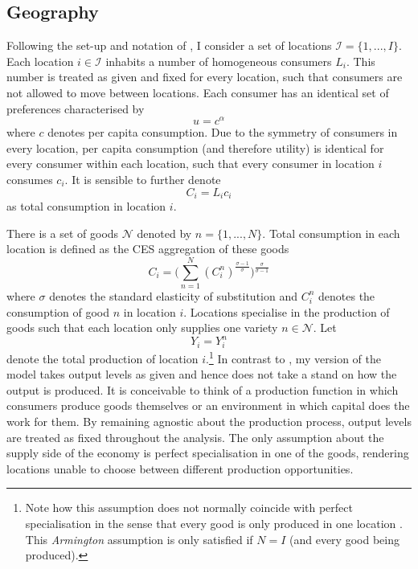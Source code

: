 \documentclass[11pt, oneside]{article}   	%
\begin{document}
\subsection{Geography}

Following the set-up and notation of \cite{fajgelbaum_optimal_2017}, I consider a set of locations $\mathcal{I} =\{ 1,...,I\}$. Each location $i \in \mathcal{I}$ inhabits a number of homogeneous consumers $L_{i}$. This number is treated as given and fixed for every location, such that consumers are not allowed to move between locations. Each consumer has an identical set of preferences characterised by
\begin{equation*}
  u = c^{\alpha}
\end{equation*}
where $c$ denotes per capita consumption. Due to the symmetry of consumers in every location, per capita consumption (and therefore utility) is identical for every consumer within each location, such that every consumer in location $i$ consumes $c_{i}$. It is sensible to further denote
\begin{equation*}
  C_{i} = L_{i}c_{i}
\end{equation*}
as total consumption in location $i$.

There is a set of goods $\mathcal{N}$ denoted by $n =\{ 1,...,N\}$. Total consumption in each location is defined as the CES aggregation of these goods
\begin{equation*}
  C_{i} = \bigg( \sum_{n=1}^{N} (C_{i}^{n})^{\frac{\sigma-1}{\sigma}}\bigg)^{\frac{\sigma}{\sigma-1}}
\end{equation*}
where $\sigma$ denotes the standard elasticity of substitution and $C_{i}^{n}$ denotes the consumption of good $n$ in location $i$. Locations specialise in the production of goods such that each location only supplies one variety $n \in \mathcal{N}$. Let
\begin{equation*}
  Y_{i} = Y_{i}^{n}
\end{equation*}
denote the total production of location $i$.\footnote{Note how this assumption does not normally coincide with perfect specialisation in the sense that every good is only produced in one location \citep[as in e.g.][]{Anderson_Gravitygravitassolution_2003}. This \emph{Armington} assumption is only satisfied if $N=I$ (and every good being produced).} In contrast to \citeauthor{fajgelbaum_optimal_2017}, my version of the model takes output levels as given and hence does not take a stand on how the output is produced. It is conceivable to think of a production function in which consumers produce goods themselves or an environment in which capital does the work for them. By remaining agnostic about the production process, output levels are treated as fixed throughout the analysis. The only assumption about the supply side of the economy is perfect specialisation in one of the goods, rendering locations unable to choose between different production opportunities.
\end{document}
